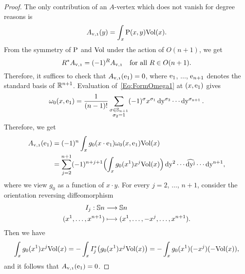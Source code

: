 \documentclass[\MainFolder/Text.tex]{subfiles}
\begin{document}
\begin{proof}
The only contribution of an $A$-vertex which does not vanish for degree reasons is
$$ A_{\NVol,\NOne}(y) = \int_x \Prpg(x,y) \Vol(x). $$
From the symmetry of $\mathrm{P}$ and $\mathrm{Vol}$ under the action of $O(n+1)$, we get
$$ R^* A_{\NVol, \NOne} = (-1)^R A_{\NVol, \NOne}\quad\text{for all }R\in O(n+1). $$
Therefore, it suffices to check that $A_{\NVol, \NOne}(\StdBasis_1) = 0$, where $\mathrm{e}_1$, $\dotsc$, $\mathrm{e}_{n+1}$ denotes the standard basis of $\mathbb{R}^{n+1}$. Evaluation of~\eqref{Eq:FormOmega1} at $(x,\mathrm{e}_1)$ gives
$$ \omega_0(x,\mathrm{e}_1) = \frac{1}{(n-1)!} \sum_{\substack{\sigma\in\mathbb{S}_{n+1}\\ \sigma_2 = 1}} (-1)^\sigma x^{\sigma_1} \operatorname{dy^{\sigma_3}} \dotsm \operatorname{dy^{\sigma_{n+1}}}. $$
Therefore, we get
$$ \begin{aligned}
A_{\NVol, \NOne}(\StdBasis_1) &= (-1)^n \int_x g_0(x\cdot \StdBasis_1) \omega_0(x,\StdBasis_1) \Vol(x)  \\ &= \sum_{j=2}^{n+1} (-1)^{n+j+1} \Bigl(\int_x g_0(x^1) x^j \Vol(x)\Bigr) \Diff{y^2} \dotsm  \widehat{\Diff{y^j}} \dotsm \Diff{y^{n+1}},
\end{aligned}$$
where we view $g_0$ as a function of $x\cdot y$. For every $j=2$, $\dotsc$, $n+1$, consider the orientation reversing diffeomorphism 
$$ \begin{aligned} 
I_j: \mathbb{S}{n} &\longrightarrow \mathbb{S}{n} \\
   (x^1, \dotsc, x^{n+1}) &\longmapsto (x^1, \dotsc, -x^j, \dotsc, x^{n+1}). 
\end{aligned} $$   
Then we have
$$ \int_x g_0(x^1) x^j \mathrm{Vol}(x)  = - \int_x I_j^*\bigl( g_0(x^1) x^j \mathrm{Vol}(x) \bigr) = - \int_x g_0(x^1)(-x^j)(-\mathrm{Vol}(x)), $$
and it follows that $A_{\NVol,\NOne}(\StdBasis_1)=0$.


\end{proof}
\end{document}

